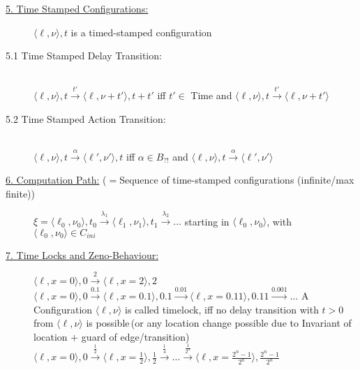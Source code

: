 \begin{tcolorbox}
\begin{description}
\item[\uline{5. Time Stamped Configurations:}] $\langle \ell, \nu \rangle, t$ is a timed-stamped configuration\\[-0.1cm]
\item[5.1 Time Stamped Delay Transition:] \hfill \\[-0.1cm]
$\langle \ell, \nu \rangle, t \xrightarrow{t'} \langle \ell, \nu + t' \rangle, t + t'$ \hfill iff $t' \in$ Time and $\langle \ell, \nu \rangle, t \xrightarrow{t'} \langle \ell, \nu + t'\rangle$
\item[5.2 Time Stamped Action Transition:] \hfill \\[-0.025cm]
$\langle \ell, \nu \rangle, t \xrightarrow{\alpha} \langle \ell', \nu' \rangle, t$ \hfill iff $ \alpha \in B_{?!}$ and $ \langle \ell, \nu \rangle, t \xrightarrow{\alpha} \langle \ell', \nu' \rangle$\\

\item[\uline{6. Computation Path:} ($=$Sequence of time-stamped configurations (infinite/max finite))]\hfill \newline
$\xi =  \langle \ell_0, \nu_0 \rangle, t_0 \xrightarrow{\lambda_1} \langle \ell_1, \nu_1 \rangle, t_1 \xrightarrow{\lambda_2} \ldots$ starting in $\langle \ell_0, \nu_0 \rangle$, with $\langle \ell_0, \nu_0 \rangle \in C_{ini}$

\item[\uline{7. Time Locks and Zeno-Behaviour:}]\hfill
{}
$\langle \ell, x=0 \rangle, 0 \xrightarrow{2} \langle \ell, x=2 \rangle, 2$ \newline
$\langle \ell, x=0 \rangle, 0 \xrightarrow{0.1} \langle \ell, x=0.1 \rangle, 0.1 \xrightarrow{0.01} \langle \ell, x=0.11 \rangle, 0.11 \xrightarrow{0.001} \ldots$ \newline
A Configuration $\langle \ell, \nu \rangle$ is called timelock, iff no delay transition with $t>0$ from $\langle \ell, \nu \rangle$ is possible\,(or any location change possible due to Invariant of location $+$ guard of edge/transition)\\
$\langle \ell, x=0 \rangle, 0 \xrightarrow{\frac{1}{2}} \langle \ell, x=\frac{1}{2} \rangle, \frac{1}{2} \xrightarrow{\frac{1}{4}} \ldots \xrightarrow{\frac{1}{2^n}} \langle \ell, x= \frac{2^n - 1}{2^n} \rangle, \frac{2^n - 1}{2^n}$


\end{description}
\end{tcolorbox}
